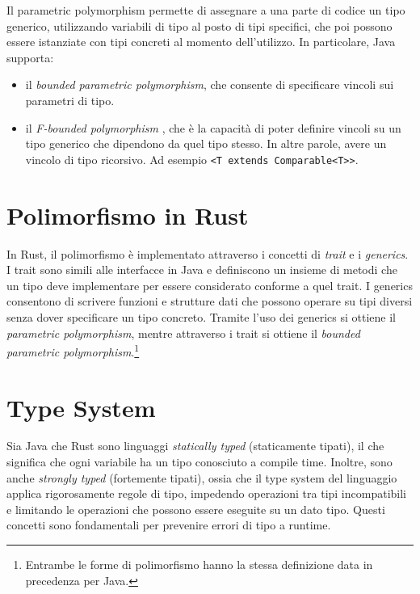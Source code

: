 Il parametric polymorphism permette di assegnare a una parte di codice un tipo generico, utilizzando variabili di tipo al posto di tipi specifici, che poi possono essere istanziate con tipi concreti al momento dell'utilizzo. In particolare, Java supporta:
\begin{itemize}
    \item il \textit{bounded parametric polymorphism}, che consente di specificare vincoli sui parametri di tipo.
    \item il \textit{F-bounded polymorphism} \cite{greenman-effing-bound-polymorphism}, che è la capacità di poter definire vincoli su un tipo generico che dipendono da quel tipo stesso. In altre parole, avere un vincolo di tipo ricorsivo. Ad esempio \texttt{<T extends Comparable<T>}\texttt{>}.
\end{itemize}
\section{Polimorfismo in Rust}
In Rust, il polimorfismo è implementato attraverso i concetti di \textit{trait} e i \textit{generics}. I trait sono simili alle interfacce in Java e definiscono un insieme di metodi che un tipo deve implementare per essere considerato conforme a quel trait. I generics consentono di scrivere funzioni e strutture dati che possono operare su tipi diversi senza dover specificare un tipo concreto. Tramite l'uso dei generics si ottiene il \textit{parametric polymorphism}, mentre attraverso i trait si ottiene il \textit{bounded parametric polymorphism}.\footnote{Entrambe le forme di polimorfismo hanno la stessa definizione data in precedenza per Java.}
\section{Type System}
Sia Java che Rust sono linguaggi \textit{statically typed} (staticamente tipati), il che significa che ogni variabile ha un tipo conosciuto a compile time. Inoltre, sono anche \textit{strongly typed} (fortemente tipati), ossia che il type system del linguaggio applica rigorosamente regole di tipo, impedendo operazioni tra tipi incompatibili e limitando le operazioni che possono essere eseguite su un dato tipo. Questi concetti sono fondamentali per prevenire errori di tipo a runtime.

